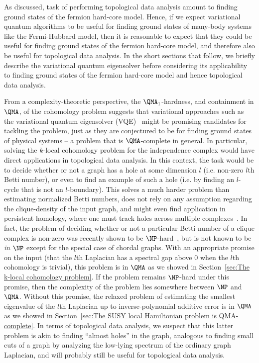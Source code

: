 \documentclass[11pt]{article}
\numberwithin{equation}{section}
\renewcommand\( {\left(}
\renewcommand\) {\right)}
\begin{document}
As discussed, task of performing topological data analysis amount to finding ground states of the fermion hard-core model. Hence, if we expect variational quantum algorithms to be useful for finding ground states of many-body  systems like the Fermi-Hubbard model, then it is reasonable to expect that they could be useful for finding ground states of the fermion hard-core model, and therefore also be useful for topological data analysis. In the short sections that follow, we briefly describe the variational quantum eigensolver before considering its applicability to finding ground states of the fermion hard-core model and hence topological data analysis.


From a complexity-theoretic perspective, the $\QMA_1$-hardness, and containment in $\QMA$, of the cohomology problem suggests that variational approaches such as the variational quantum eigensolver (VQE)~\cite{peruzzo2014variational,mcclean2016theory} might be promising candidates for tackling the problem, just as they are conjectured to be for finding ground states of physical systems -- a problem that is $\QMA$-complete in general. In particular, solving the {\sc $k$-local cohomology} problem for the independence complex would have direct applications in topological data analysis. In this context, the task would be to decide whether or not a graph has a hole at some dimension $l$ (i.e. non-zero $l$th Betti number), or even to find an example of such a hole (i.e. by finding an $l$-cycle that is not an $l$-boundary). This solves a much harder problem than estimating normalized Betti numbers, does not rely on any assumption regarding the clique-density of the input graph, and might even find application in persistent homology, where one must track holes across multiple complexes~\cite{ghrist2008barcodes}. In fact, the problem of deciding whether or not a particular Betti number of a clique complex is non-zero was recently shown to be $\NP$-hard~\cite{ADAMASZEK20168}, but is not known to be \emph{in} $\NP$ except for the special case of chordal graphs. With an appropriate promise on the input (that the $l$th Laplacian has a spectral gap above 0 when the $l$th cohomology is trivial), this problem is in $\QMA$ as we showed in Section~\ref{sec:The k-local cohomology problem}. If the problem remains $\NP$-hard under this promise, then the complexity of the problem lies somewhere between $\NP$ and $\QMA$. Without this promise, the relaxed problem of estimating the smallest eigenvalue of the $l$th Laplacian up to inverse-polynomial additive error is in $\QMA$ as we showed in Section~\ref{sec:The SUSY local Hamiltonian problem is QMA-complete}. In terms of topological data analysis, we suspect that this latter problem is akin to finding ``almost holes'' in the graph, analogous to finding small cuts of a graph by analyzing the low-lying spectrum of the ordinary graph Laplacian, and will probably still be useful for topological data analysis.
\end{document}
